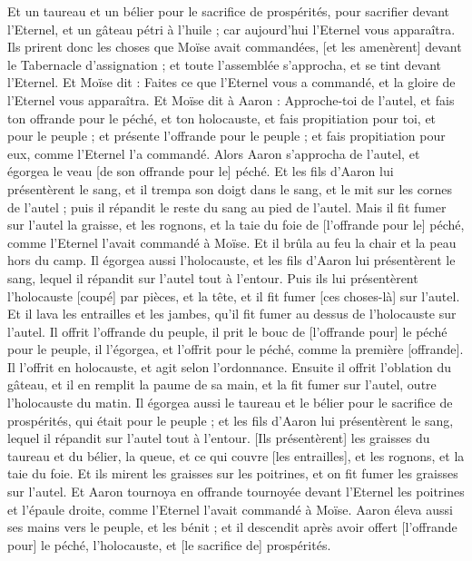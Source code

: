\begin{multicols}{2}
Et un taureau et un bélier pour le sacrifice de prospérités, pour sacrifier devant l'Eternel, et un gâteau pétri à l'huile ; car aujourd'hui l'Eternel vous apparaîtra.
Ils prirent donc les choses que Moïse avait commandées, [et les amenèrent] devant le Tabernacle d'assignation ; et toute l'assemblée s'approcha, et se tint devant l'Eternel.
Et Moïse dit : Faites ce que l'Eternel vous a commandé, et la gloire de l'Eternel vous apparaîtra.
Et Moïse dit à Aaron : Approche-toi de l'autel, et fais ton offrande pour le péché, et ton holocauste, et fais propitiation pour toi, et pour le peuple ; et présente l'offrande pour le peuple ; et fais propitiation pour eux, comme l'Eternel l'a commandé.
Alors Aaron s'approcha de l'autel, et égorgea le veau [de son offrande pour le] péché.
Et les fils d'Aaron lui présentèrent le sang, et il trempa son doigt dans le sang, et le mit sur les cornes de l'autel ; puis il répandit le reste du sang au pied de l'autel.
Mais il fit fumer sur l'autel la graisse, et les rognons, et la taie du foie de [l'offrande pour le] péché, comme l'Eternel l'avait commandé à Moïse.
Et il brûla au feu la chair et la peau hors du camp.
Il égorgea aussi l'holocauste, et les fils d'Aaron lui présentèrent le sang, lequel il répandit sur l'autel tout à l'entour.
Puis ils lui présentèrent l'holocauste [coupé] par pièces, et la tête, et il fit fumer [ces choses-là] sur l'autel.
Et il lava les entrailles et les jambes, qu'il fit fumer au dessus de l'holocauste sur l'autel.
Il offrit l'offrande du peuple, il prit le bouc de [l'offrande pour] le péché pour le peuple, il l'égorgea, et l'offrit pour le péché, comme la première [offrande].
Il l'offrit en holocauste, et agit selon l'ordonnance.
Ensuite il offrit l'oblation du gâteau, et il en remplit la paume de sa main, et la fit fumer sur l'autel, outre l'holocauste du matin.
Il égorgea aussi le taureau et le bélier pour le sacrifice de prospérités, qui était pour le peuple ; et les fils d'Aaron lui présentèrent le sang, lequel il répandit sur l'autel tout à l'entour.
[Ils présentèrent] les graisses du taureau et du bélier, la queue, et ce qui couvre [les entrailles], et les rognons, et la taie du foie.
Et ils mirent les graisses sur les poitrines, et on fit fumer les graisses sur l'autel.
Et Aaron tournoya en offrande tournoyée devant l'Eternel les poitrines et l'épaule droite, comme l'Eternel l'avait commandé à Moïse.
Aaron éleva aussi ses mains vers le peuple, et les bénit ; et il descendit après avoir offert [l'offrande pour] le péché, l'holocauste, et [le sacrifice de] prospérités.

\end{multicols}

